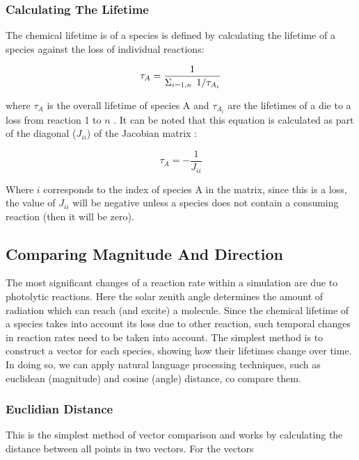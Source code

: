   \subsubsection{Calculating The Lifetime}
  The chemical lifetime is of a species is defined by calculating the lifetime of a species against the loss of individual reactions:





    \begin{equation}
    \tau_A = \frac{1}{\Large{\Sigma}_{i=1,n}\  {1}/{\tau_{A_i}}}
    \end{equation}

where $\tau_A$ is the overall lifetime of species A and $\tau_{A_i}$ are the lifetimes of a die to a loss from reaction 1 to $n$ \citep{fundamentals}. It can be noted that this equation is calculated as part of the diagonal ($J_{ii}$) of the Jacobian matrix \citep{kinetics,lifetime}:


  \begin{equation}
  \tau_A = - \frac{1}{J_{ii}}
  \end{equation}

Where $i$ corresponds to the index of species A in the matrix, since this is a loss, the value of $J_{ii}$ will be negative unless a species does not contain a consuming reaction (then it will be zero).




  \subsection{Comparing Magnitude And Direction}
The most significant changes of a reaction rate within a simulation are due to photolytic reactions. Here the solar zenith angle determines the amount of radiation which can reach (and excite) a molecule. Since the chemical lifetime of a species takes into account its loss due to other reaction, such temporal changes in reaction rates need to be taken into account. The simplest method is to construct a vector for each species, showing how their lifetimes change over time. In doing so, we can apply natural language processing techniques, such as euclidean (magnitude) and cosine (angle) distance, co compare them.

  \subsubsection{Euclidian Distance} \label{sec:euclid}
  This is the simplest method of vector comparison and works by calculating the distance between all points in two vectors. For the vectors

